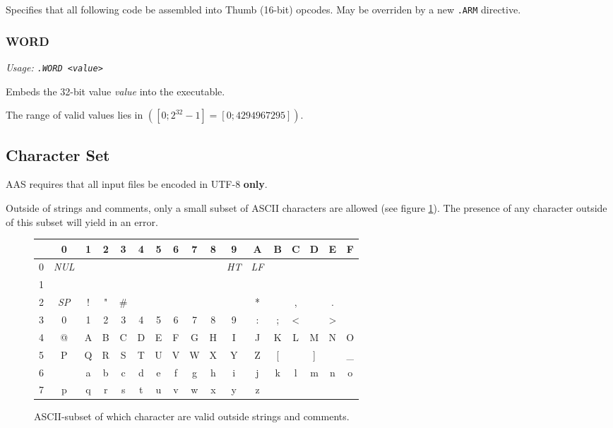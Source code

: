 \documentclass[a4paper]{article}
\begin{document}
				Specifies that all following code be assembled into Thumb (16-bit) opcodes. May be overriden by a new \texttt{.ARM} directive.

			\subsubsection{WORD}
				\textit{Usage: \texttt{.WORD <value>}}

				Embeds the 32-bit value \textit{value} into the executable.

				The range of valid values lies in $([0;2^{32}-1]=[0;4294967295])$.

		\subsection{Character Set}
			AAS requires that all input files be encoded in UTF-8 \textbf{only}.

			Outside of strings and comments, only a small subset of ASCII characters are allowed (see figure \ref{fig:characters}). The presence of any character outside of this subset will yield in an error.

			\begin{figure}[h]
				\centering

				\caption{ASCII-subset of which character are valid outside strings and comments.}
				\label{fig:characters}
				\begin{tabular}{|c|c c c c c c c c c c c c c c c c|}
					\hline
					{} & 0 & 1 & 2 & 3 & 4 & 5 & 6 & 7 & 8 & 9 & A & B & C & D & E & F \\
					\hline
					0 & \textit{NUL} & {} & {} & {} & {} & {} & {} & {} & {} & \textit{HT} & \textit{LF} & {} & {} & {} & {} & {} \\
					1 & {} & {} & {} & {} & {} & {} & {} & {} & {} & {} & {} & {} & {} & {} & {} & {} \\
					2 & \textit{SP} & ! & " & \# & {} & {} & {} & {} & {} & {} & * & {} & , & {} & . & {} \\
					3 & 0 & 1 & 2 & 3 & 4 & 5 & 6 & 7 & 8 & 9 & : & ; & < & {} & > & {} \\
					4 & @ & A & B & C & D & E & F & G & H & I & J & K & L & M & N & O \\
					5 & P & Q & R & S & T & U & V & W & X & Y & Z & [ & {} & ] & {} & \_ \\
					6 & {} & a & b & c & d & e & f & g & h & i & j & k & l & m & n & o \\
					7 & p & q & r & s & t & u & v & w & x & y & z & {} & {} & {} & {} & {} \\
					\hline
				\end{tabular}
			\end{figure}
\end{document}
